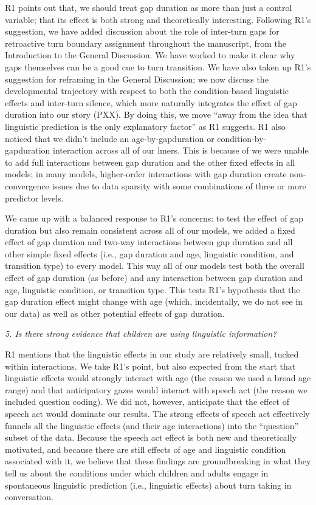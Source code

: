 \documentclass[11pt,a4paper]{letter} %
\begin{document}
\begin{letter}{}
\noindent R1 points out that, we should treat gap duration as more than just a control variable; that its effect is both strong and theoretically interesting. Following R1's suggestion, we have added discussion about the role of inter-turn gaps for retroactive turn boundary assignment throughout the manuscript, from the Introduction to the General Discussion. We have worked to make it clear why gaps themselves can be a good cue to turn transition. We have also taken up R1's suggestion for reframing in the General Discussion; we now discuss the developmental trajectory with respect to both the condition-based linguistic effects and inter-turn silence, which more naturally integrates the effect of gap duration into our story (PXX). By doing this, we move ``away from the idea that linguistic prediction is the only explanatory factor'' as R1 suggests. R1 also noticed that we didn't include an age-by-gapduration or condition-by-gapduration interaction across all of our lmers. This is because of we were unable to add full interactions between gap duration and the other fixed effects in all models; in many models, higher-order interactions with gap duration create non-convergence issues due to data sparsity with some combinations of three or more predictor levels.

\noindent We came up with a balanced response to R1's concerns: to test the effect of gap duration but also remain consistent across all of our models, we added a fixed effect of gap duration and two-way interactions between gap duration and all other simple fixed effects (i.e., gap duration and age, linguistic condition, and transition type) to every model. This way all of our models test both the overall effect of gap duration (as before) and any interaction between gap duration and age, linguistic condition, or transition type. This tests R1's hypothesis that the gap duration effect might change with age (which, incidentally, we do not see in our data) as well as other potential effects of gap duration.

\noindent \textit{5. Is there strong evidence that children are using linguistic information?}

\noindent R1 mentions that the linguistic effects in our study are relatively small, tucked within interactions. We take R1's point, but also expected from the start that linguistic effects would strongly interact with age (the reason we used a broad age range) and that anticipatory gazes would interact with speech act (the reason we included question coding). We did not, however, anticipate that the effect of speech act would dominate our results. The strong effects of speech act effectively funnels all the linguistic effects (and their age interactions) into the ``question'' subset of the data. Because the speech act effect is both new and theoretically motivated, and because there are still effects of age and linguistic condition associated with it, we believe that these findings are groundbreaking in what they tell us about the conditions under which children and adults engage in spontaneous linguistic prediction (i.e., linguistic effects) about turn taking in conversation.


\end{letter}
\end{document}

